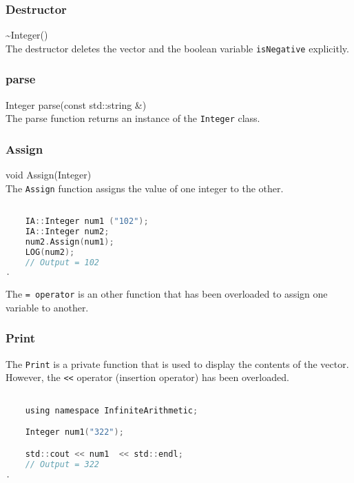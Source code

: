 \subsubsection{Destructor}  \vspace*{0.5em}

{\ttfamily \large \~{}Integer()} \\[2mm]
The destructor deletes the vector and the boolean variable \verb|isNegative| explicitly.


\subsubsection{parse} 

{\ttfamily \large Integer parse(const std::string \&)} \\[2mm]
The parse function returns an instance of the \verb|Integer| class.

\subsubsection{Assign}  
{\ttfamily \large void Assign(Integer)} \\[2mm]
The \verb|Assign| function assigns the value of one integer to the other.
\vspace*{1em}
\begin{lstlisting}[language = C]	

	IA::Integer num1 ("102");
	IA::Integer num2;
	num2.Assign(num1);
	LOG(num2);
	// Output = 102
.
\end{lstlisting}
\vspace*{1em}

The \verb|= operator| is an other function that has been overloaded to assign one variable to another.


\subsubsection{Print}
The \verb|Print| is a private function that is used to display the contents of the vector. \\
However, the \verb|<<| operator (insertion operator) has been overloaded.
\vspace*{1em}
\begin{lstlisting}[language = C]

	using namespace InfiniteArithmetic;

	Integer num1("322");

	std::cout << num1  << std::endl; 
	// Output = 322
.
\end{lstlisting}
\vspace*{1em}

